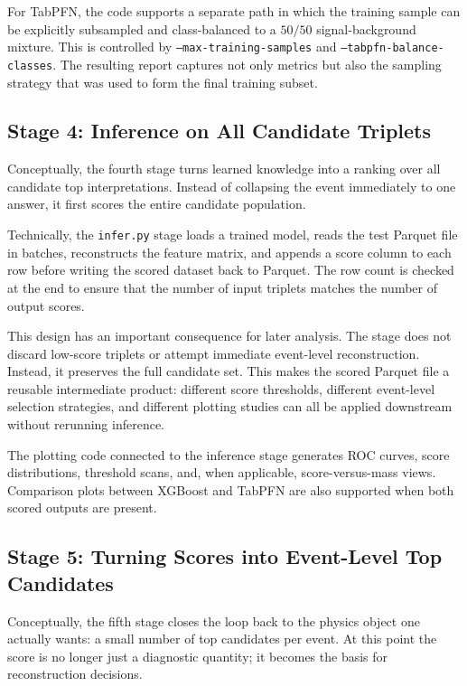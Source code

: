 \documentclass[11pt]{article}
\begin{document}
For TabPFN, the code supports a separate path in which the training sample can be explicitly subsampled and class-balanced to a $50/50$ signal-background mixture. This is controlled by \texttt{--max-training-samples} and \texttt{--tabpfn-balance-classes}. The resulting report captures not only metrics but also the sampling strategy that was used to form the final training subset.

\subsection{Stage 4: Inference on All Candidate Triplets}

Conceptually, the fourth stage turns learned knowledge into a ranking over all candidate top interpretations. Instead of collapsing the event immediately to one answer, it first scores the entire candidate population.

Technically, the \texttt{infer.py} stage loads a trained model, reads the test Parquet file in batches, reconstructs the feature matrix, and appends a score column to each row before writing the scored dataset back to Parquet. The row count is checked at the end to ensure that the number of input triplets matches the number of output scores.

This design has an important consequence for later analysis. The stage does not discard low-score triplets or attempt immediate event-level reconstruction. Instead, it preserves the full candidate set. This makes the scored Parquet file a reusable intermediate product: different score thresholds, different event-level selection strategies, and different plotting studies can all be applied downstream without rerunning inference.

The plotting code connected to the inference stage generates ROC curves, score distributions, threshold scans, and, when applicable, score-versus-mass views. Comparison plots between XGBoost and TabPFN are also supported when both scored outputs are present.

\subsection{Stage 5: Turning Scores into Event-Level Top Candidates}

Conceptually, the fifth stage closes the loop back to the physics object one actually wants: a small number of top candidates per event. At this point the score is no longer just a diagnostic quantity; it becomes the basis for reconstruction decisions.
\end{document}
